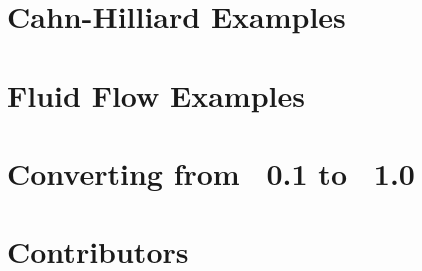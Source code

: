 \documentclass[letterpaper,twoside,openright,10pt]{memoir}
\begin{document}
\chapter{Cahn-Hilliard Examples}



\chapter{Fluid Flow Examples}



\chapter{Converting from \FiPy{}~0.1 to \FiPy{}~1.0}
\label{chap:Update0.1to1.0}




\backmatter


\fussy

% 



\sloppy
\raggedright
\printindex

\fussy

\appendix 


\chapter*{Contributors}
\label{chap:Contributors}



\end{document}
